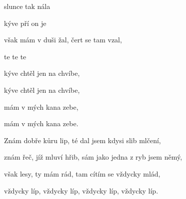 

\zs
{} slunce  tak  nála     

 kýve  pří on je      

 však mám v duši žal, čert  se tam vzal,

te te te 
\ks

\zr
{} kýve  chtěl  jen na chvíbe,

 kýve  chtěl  jen na chvíbe,

 mám  v mých  kana zebe,

 mám  v mých  kana zebe.
\kr

\zs
Znám dobře kůru lip, té dal jsem kdysi slib mlčení,

znám řeč, jíž mluví hřib, sám jako jedna z ryb jsem němý,

však lesy, ty mám rád, tam cítím se vždycky mlád,

vždycky líp, vždycky líp, vždycky líp, vždycky líp.
\ks

\zr
\kr

\kp



